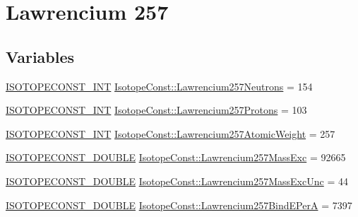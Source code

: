 \hypertarget{group___isotope_const-_lawrencium-_lr257}{}\section{Lawrencium 257}
\label{group___isotope_const-_lawrencium-_lr257}
\subsection*{Variables}
\begin{DoxyCompactItemize}
\item 
\mbox{\hyperlink{group___isotope_const-_macros_ga5f18360b3e99483a35c32d789e62621c}{I\+S\+O\+T\+O\+P\+E\+C\+O\+N\+S\+T\+\_\+\+I\+NT}} \mbox{\hyperlink{group___isotope_const-_lawrencium-_lr257_ga2e244267a931fbea1b2344edc663ceb8}{Isotope\+Const\+::\+Lawrencium257\+Neutrons}} = 154
\item 
\mbox{\hyperlink{group___isotope_const-_macros_ga5f18360b3e99483a35c32d789e62621c}{I\+S\+O\+T\+O\+P\+E\+C\+O\+N\+S\+T\+\_\+\+I\+NT}} \mbox{\hyperlink{group___isotope_const-_lawrencium-_lr257_ga7483bad407444319d881f6dd7d733628}{Isotope\+Const\+::\+Lawrencium257\+Protons}} = 103
\item 
\mbox{\hyperlink{group___isotope_const-_macros_ga5f18360b3e99483a35c32d789e62621c}{I\+S\+O\+T\+O\+P\+E\+C\+O\+N\+S\+T\+\_\+\+I\+NT}} \mbox{\hyperlink{group___isotope_const-_lawrencium-_lr257_ga66ba67436a05fef49b9fedff8d0095d6}{Isotope\+Const\+::\+Lawrencium257\+Atomic\+Weight}} = 257
\item 
\mbox{\hyperlink{group___isotope_const-_macros_ga8f45a7272ce02c0b4c65c44636ed719a}{I\+S\+O\+T\+O\+P\+E\+C\+O\+N\+S\+T\+\_\+\+D\+O\+U\+B\+LE}} \mbox{\hyperlink{group___isotope_const-_lawrencium-_lr257_ga3d4cb011111b721f66afb1791045abea}{Isotope\+Const\+::\+Lawrencium257\+Mass\+Exc}} = 92665
\item 
\mbox{\hyperlink{group___isotope_const-_macros_ga8f45a7272ce02c0b4c65c44636ed719a}{I\+S\+O\+T\+O\+P\+E\+C\+O\+N\+S\+T\+\_\+\+D\+O\+U\+B\+LE}} \mbox{\hyperlink{group___isotope_const-_lawrencium-_lr257_gaec7ad65f73c6d15a25688763d69747c7}{Isotope\+Const\+::\+Lawrencium257\+Mass\+Exc\+Unc}} = 44
\item 
\mbox{\hyperlink{group___isotope_const-_macros_ga8f45a7272ce02c0b4c65c44636ed719a}{I\+S\+O\+T\+O\+P\+E\+C\+O\+N\+S\+T\+\_\+\+D\+O\+U\+B\+LE}} \mbox{\hyperlink{group___isotope_const-_lawrencium-_lr257_ga025add3cdee102bc6005dc58ada7495b}{Isotope\+Const\+::\+Lawrencium257\+Bind\+E\+PerA}} = 7397
\item 

\end{DoxyCompactItemize}
